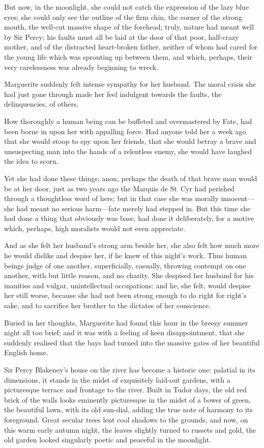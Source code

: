 But now, in the moonlight, she could not catch the expression of the lazy blue eyes; she could only see the outline of the firm chin, the corner of the strong mouth, the well-cut massive shape of the forehead; truly, nature had meant well by Sir Percy; his faults must all be laid at the door of that poor, half-crazy mother, and of the distracted heart-broken father, neither of whom had cared for the young life which was sprouting up between them, and which, perhaps, their very carelessness was already beginning to wreck.

Marguerite suddenly felt intense sympathy for her husband. The moral crisis she had just gone through made her feel indulgent towards the faults, the delinquencies, of others.

How thoroughly a human being can be buffeted and overmastered by Fate, had been borne in upon her with appalling force. Had anyone told her a week ago that she would stoop to spy upon her friends, that she would betray a brave and unsuspecting man into the hands of a relentless enemy, she would have laughed the idea to scorn.

Yet she had done these things; anon, perhaps the death of that brave man would be at her door, just as two years ago the Marquis de St~Cyr had perished through a thoughtless word of hers; but in that case she was morally innocent\allowbreak---\allowbreak she had meant no serious harm\allowbreak---\allowbreak fate merely had stepped in. But this time she had done a thing that obviously was base, had done it deliberately, for a motive which, perhaps, high moralists would not even appreciate.

And as she felt her husband's strong arm beside her, she also felt how much more he would dislike and despise her, if he knew of this night's work. Thus human beings judge of one another, superficially, casually, throwing contempt on one another, with but little reason, and no charity. She despised her husband for his inanities and vulgar, unintellectual occupations; and he, she felt, would despise her still worse, because she had not been strong enough to do right for right's sake, and to sacrifice her brother to the dictates of her conscience.

Buried in her thoughts, Marguerite had found this hour in the breezy summer night all too brief; and it was with a feeling of keen disappointment, that she suddenly realised that the bays had turned into the massive gates of her beautiful English home.

Sir Percy Blakeney's house on the river has become a historic one: palatial in its dimensions, it stands in the midst of exquisitely laid-out gardens, with a picturesque terrace and frontage to the river. Built in Tudor days, the old red brick of the walls looks eminently picturesque in the midst of a bower of green, the beautiful lawn, with its old sun-dial, adding the true note of harmony to its foreground. Great secular trees lent cool shadows to the grounds, and now, on this warm early autumn night, the leaves slightly turned to russets and gold, the old garden looked singularly poetic and peaceful in the moonlight.

